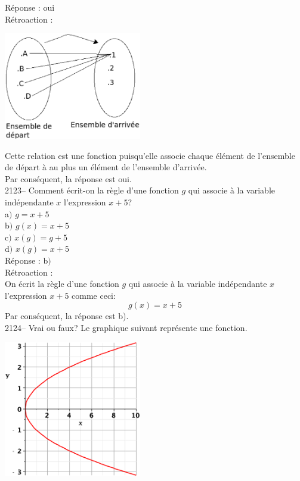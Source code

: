 \documentclass[letterpaper, 12pt]{article}
\begin{document}
R\'eponse : oui\\

R\'etroaction :\\
\begin{center}
 \includegraphics[width=6cm,bb=0 542 400 842]{Q2121.eps}
\end{center}
Cette relation est une fonction puisqu'elle associe chaque \'el\'ement de l'ensemble de d\'epart \`a au plus un \'el\'ement de l'ensemble d'arriv\'ee.\\
Par cons\'equent, la r\'eponse est oui.\\

2123-- Comment \'ecrit-on la r\`egle d'une fonction $g$ qui associe \`a la variable ind\'ependante $x$ l'expression $x + 5$?\\

a$)$  $g = x + 5$\\
b$)$  $g(x) = x + 5$ \\
c$)$  $x(g) = g + 5$\\
d$)$  $x(g) = x + 5$\\

R\'eponse : b$)$\\

R\'etroaction :\\
On \'ecrit la r\`egle d'une fonction $g$ qui associe \`a la variable ind\'ependante $x$ l'expression $x + 5$ comme ceci:
\begin{equation*}
 g(x) = x + 5
\end{equation*}
Par cons\'equent, la r\'eponse est b).\\

2124-- Vrai ou faux? Le graphique suivant repr\'esente une fonction. \\
\begin{center}
 \includegraphics[width=6cm,bb=20 118 575 673]{Q2124.eps}
\end{center}
\end{document}
